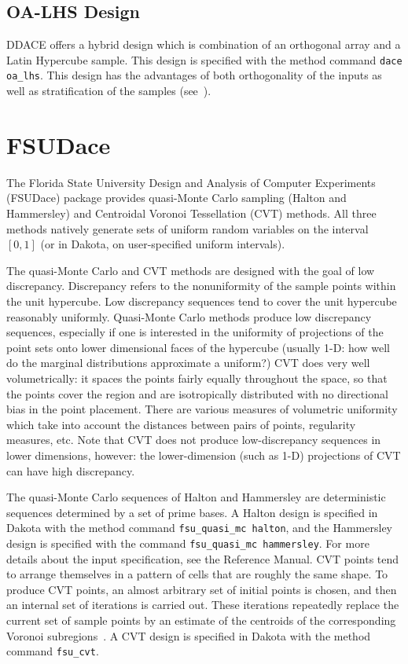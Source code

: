\subsection{OA-LHS Design}\label{dace:oalhs}

DDACE offers a hybrid design which is combination of an orthogonal
array and a Latin Hypercube sample.  This design is specified with the
method command \texttt{dace oa\_lhs}.  This design has the advantages
of both orthogonality of the inputs as well as stratification of the
samples (see~\cite{Owe92}).

\section{FSUDace}\label{dace:fsudace}

The Florida State University Design and Analysis of Computer
Experiments (FSUDace) package provides quasi-Monte Carlo sampling
(Halton and Hammersley) and Centroidal Voronoi Tessellation (CVT)
methods.  All three methods natively generate sets of uniform random
variables on the interval $[0,1]$ (or in Dakota, on user-specified
uniform intervals).

The quasi-Monte Carlo and CVT methods are designed with the goal of
low discrepancy. Discrepancy refers to the nonuniformity of the sample
points within the unit hypercube. Low discrepancy sequences tend to
cover the unit hypercube reasonably uniformly. Quasi-Monte Carlo
methods produce low discrepancy sequences, especially if one is
interested in the uniformity of projections of the point sets onto
lower dimensional faces of the hypercube (usually 1-D: how well do the
marginal distributions approximate a uniform?) CVT does very well
volumetrically: it spaces the points fairly equally throughout the
space, so that the points cover the region and are isotropically
distributed with no directional bias in the point placement. There are
various measures of volumetric uniformity which take into account the
distances between pairs of points, regularity measures, etc. Note that
CVT does not produce low-discrepancy sequences in lower dimensions,
however: the lower-dimension (such as 1-D) projections of CVT can have
high discrepancy.

The quasi-Monte Carlo sequences of Halton and Hammersley are
deterministic sequences determined by a set of prime bases.
A Halton design is specified in Dakota with the method command 
\texttt{fsu\_quasi\_mc halton}, and the Hammersley design is 
specified with the command \texttt{fsu\_quasi\_mc hammersley}.
For more details about the input specification, see the Reference Manual.
CVT points tend to arrange themselves in a pattern
of cells that are roughly the same shape. To produce CVT
points, an almost arbitrary set of initial points is chosen, and then
an internal set of iterations is carried out. These iterations
repeatedly replace the current set of sample points by an estimate of
the centroids of the corresponding Voronoi subregions~\cite{Du99}.
A CVT design is specified in Dakota with the method command
\texttt{fsu\_cvt}.

